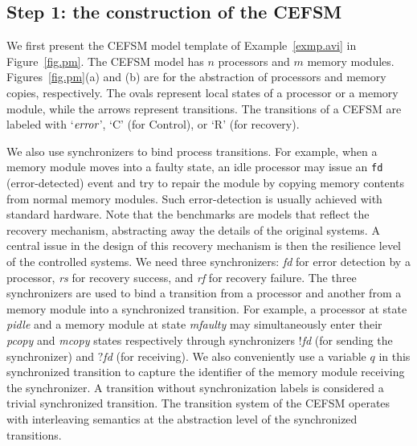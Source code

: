 \subsection*{Step 1: the construction of the CEFSM}
We first present the CEFSM model template 
of Example~\ref{exmp.avi} in Figure~\ref{fig.pm}. 
The CEFSM model has $n$ processors and $m$ memory modules. 
Figures~\ref{fig.pm}(a) and (b) are 
for the abstraction of processors and memory copies, respectively.  
The ovals represent local states of a processor or a 
memory module, while the arrows represent transitions. 
The transitions of a CEFSM are labeled with `$\textit{error}$', 
`C' (for Control), or `R' (for recovery).  

We also use synchronizers to bind process transitions. 
For example, when a memory module moves into a faulty state, 
an idle processor may issue an {\tt fd} (error-detected) event
and try to repair the module by copying memory contents from 
normal memory modules.  
Such error-detection is usually achieved with standard hardware.  
Note that the benchmarks are models that reflect the 
recovery mechanism, abstracting away the details of the original systems.  
A central issue in the design of this recovery mechanism is then 
the resilience level of the controlled systems.  
We need three synchronizers: 
\textit{fd} for error detection by a processor, 
\textit{rs} for recovery success, 
and \textit{rf} for recovery failure.  
The three synchronizers are used to bind a transition from a processor 
and another from a memory module into a synchronized transition.  
For example, a processor at state \textit{pidle} and 
a memory module at state 
\textit{mfaulty} may simultaneously enter their 
\textit{pcopy} and \textit{mcopy} states respectively
through synchronizers $!$\textit{fd} (for sending the synchronizer) 
and $?$\textit{fd} (for receiving). 
We also conveniently use a variable $q$ in this synchronized 
transition to capture the identifier of the memory module receiving 
the synchronizer.  
A transition without synchronization labels is considered a trivial 
synchronized transition.  
The transition system of the CEFSM operates with interleaving semantics 
at the abstraction level of the synchronized transitions. 

